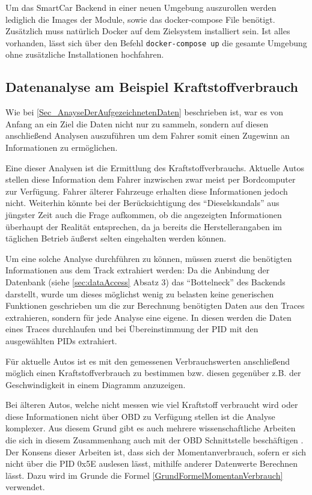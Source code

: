 Um das SmartCar Backend in einer neuen Umgebung auszurollen werden lediglich die Images der Module, sowie das docker-compose File benötigt. Zusätzlich muss natürlich Docker auf dem Zielsystem installiert sein. Ist alles vorhanden, lässt sich über den Befehl \texttt{docker-compose up} die gesamte Umgebung ohne zusätzliche Installationen hochfahren.

\subsection{Datenanalyse am Beispiel Kraftstoffverbrauch}
Wie bei \ref{Sec_AnayseDerAufgezeichnetenDaten} beschrieben ist, war es von Anfang an ein Ziel die Daten nicht nur zu sammeln, sondern auf diesen anschließend Analysen auszuführen um dem Fahrer somit einen Zugewinn an Informationen zu ermöglichen. 

Eine dieser Analysen ist die Ermittlung des Kraftstoffverbrauchs. Aktuelle Autos stellen diese Information dem Fahrer inzwischen zwar meist per Bordcomputer zur Verfügung. Fahrer älterer Fahrzeuge erhalten diese Informationen jedoch nicht. Weiterhin könnte bei der Berücksichtigung des \enquote{Dieselskandals} aus jüngster Zeit auch die Frage aufkommen, ob die angezeigten Informationen überhaupt der Realität entsprechen, da ja bereits die Herstellerangaben im täglichen Betrieb äußerst selten eingehalten werden können.

Um eine solche Analyse durchführen zu können, müssen zuerst die benötigten Informationen aus dem Track extrahiert werden:\newline
Da die Anbindung der Datenbank (siehe \ref{sec:dataAccess} Absatz 3) das \enquote{Bottelneck} des Backends darstellt, wurde um dieses möglichst wenig zu belasten keine generischen Funktionen geschrieben um die zur Berechnung benötigten Daten aus den Traces extrahieren, sondern für jede Analyse eine eigene. In diesen werden die Daten eines Traces durchlaufen und bei Übereinstimmung der \acs{PID} mit den ausgewählten \acp{PID} extrahiert.

Für aktuelle Autos ist es mit den gemessenen Verbrauchswerten anschließend möglich einen Kraftstoffverbrauch zu bestimmen bzw. diesen gegenüber z.B. der Geschwindigkeit in einem Diagramm anzuzeigen.

Bei älteren Autos, welche nicht messen wie viel Kraftstoff verbraucht wird oder diese Informationen nicht über \ac{OBD} zu Verfügung stellen ist die Analyse komplexer. Aus diesem Grund gibt es auch mehrere wissenschaftliche Arbeiten die sich in diesem Zusammenhang auch mit der \ac{OBD} Schnittstelle beschäftigen \cite{obdConsumption} \cite{rtFuel}. Der Konsens dieser Arbeiten ist, dass sich der Momentanverbrauch, sofern er sich nicht über die \ac{PID} 0x5E auslesen lässt, mithilfe anderer Datenwerte Berechnen lässt.
Dazu wird im Grunde die Formel \ref{GrundFormelMomentanVerbrauch} verwendet. 

